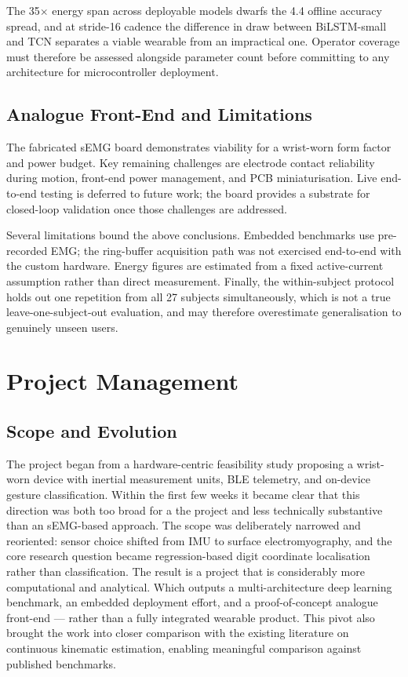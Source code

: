 \documentclass[11pt]{article}
\begin{document}
The 35$\times$ energy span across deployable models dwarfs the 4.4\textdegree{} offline accuracy spread, and at stride-16 cadence the difference in draw between BiLSTM-small and TCN separates a viable wearable from an impractical one. Operator coverage must therefore be assessed alongside parameter count before committing to any architecture for microcontroller deployment.

\subsection{Analogue Front-End and Limitations}
\label{sec:disc_hardware}

The fabricated sEMG board demonstrates viability for a wrist-worn form factor and power budget. Key remaining challenges are electrode contact reliability during motion, front-end power management, and PCB miniaturisation. Live end-to-end testing is deferred to future work; the board provides a substrate for closed-loop validation once those challenges are addressed.

Several limitations bound the above conclusions. Embedded benchmarks use pre-recorded EMG; the ring-buffer acquisition path was not exercised end-to-end with the custom hardware. Energy figures are estimated from a fixed active-current assumption rather than direct measurement. Finally, the within-subject protocol holds out one repetition from all 27 subjects simultaneously, which is not a true leave-one-subject-out evaluation, and may therefore overestimate generalisation to genuinely unseen users.

\section{Project Management}
\label{sec:pm}

\subsection{Scope and Evolution}

The project began from a hardware-centric feasibility study proposing a wrist-worn device with inertial measurement units, BLE telemetry, and on-device gesture classification. Within the first few weeks it became clear that this direction was both too broad for a the project and less technically substantive than an sEMG-based approach. The scope was deliberately narrowed and reoriented: sensor choice shifted from IMU to surface electromyography, and the core research question became regression-based digit coordinate localisation rather than classification. The result is a project that is considerably more computational and analytical. Which outputs a multi-architecture deep learning benchmark, an embedded deployment effort, and a proof-of-concept analogue front-end — rather than a fully integrated wearable product. This pivot also brought the work into closer comparison with the existing literature on continuous kinematic estimation, enabling meaningful comparison against published benchmarks.
\end{document}
